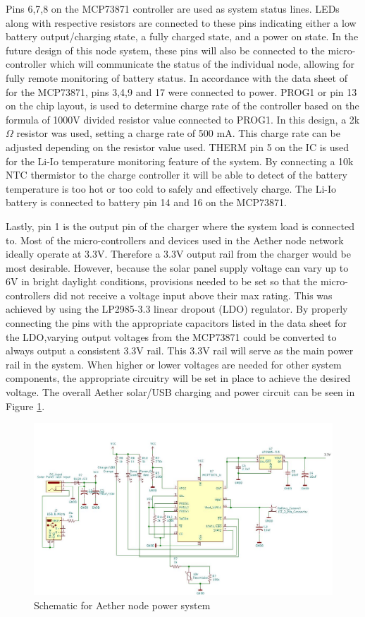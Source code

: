 Pins 6,7,8 on the MCP73871 controller are used as system status lines. LEDs along with respective resistors are connected to these pins indicating either a low battery output/charging state, a fully charged state, and a power on state. In the future design of this node system, these pins will also be connected to the micro-controller which will communicate the status of the individual node, allowing for fully remote monitoring of battery status. In accordance with the data sheet of for the MCP73871, pins 3,4,9 and 17 were connected to power. PROG1 or pin 13 on the chip layout, is used to determine charge rate of the controller based on the formula of 1000V divided resistor value connected to PROG1. In this design, a 2k$\Omega$ resistor was used, setting a charge rate of 500 mA. This charge rate can be adjusted depending on the resistor value used. THERM pin 5 on the IC is used for the Li-Io temperature monitoring feature of the system. By connecting a 10k NTC thermistor to the charge controller it will be able to detect of the battery temperature is too hot or too cold to safely and effectively charge. The Li-Io battery is connected to battery pin 14 and 16 on the MCP73871.

Lastly, pin 1 is the output pin of the charger where the system load is connected to. Most of the micro-controllers and devices used in the Aether node network ideally operate at 3.3V. Therefore a 3.3V output rail from the charger would be most desirable. However, because the solar panel supply voltage can vary up to 6V in bright daylight conditions, provisions needed to be set so that the micro-controllers did not receive a voltage input above their max rating. This was achieved by using the LP2985-3.3 linear dropout (LDO) regulator. By properly connecting the pins with the appropriate capacitors listed in the data sheet for the LDO,varying output voltages from the MCP73871 could be converted to always output a consistent 3.3V rail. This 3.3V rail will serve as the main power rail in the system. When higher or lower voltages are needed for other system components, the appropriate circuitry will be set in place to achieve the desired voltage. The overall Aether solar/USB charging and power circuit can be seen in Figure \ref{fig:power-schematic}.

\begin{figure}
    \centering
    \includegraphics[width=6in]{figures/Power Schematic.JPG}
    \caption{Schematic for Aether node power system}
    \label{fig:power-schematic} 
\end{figure}